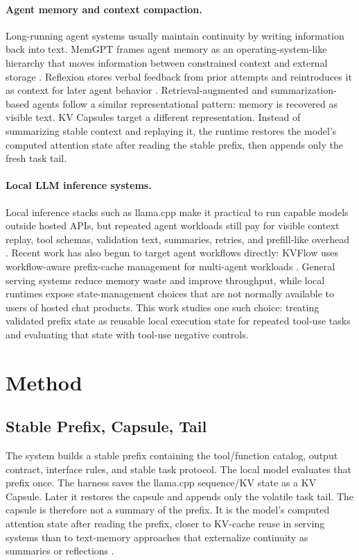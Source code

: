 \documentclass[11pt]{article}
\begin{document}
\paragraph{Agent memory and context compaction.}
Long-running agent systems usually maintain continuity by writing information back into text. MemGPT frames agent memory as an operating-system-like hierarchy that moves information between constrained context and external storage \cite{packer2023memgpt}. Reflexion stores verbal feedback from prior attempts and reintroduces it as context for later agent behavior \cite{shinn2023reflexion}. Retrieval-augmented and summarization-based agents follow a similar representational pattern: memory is recovered as visible text. KV Capsules target a different representation. Instead of summarizing stable context and replaying it, the runtime restores the model's computed attention state after reading the stable prefix, then appends only the fresh task tail.

\paragraph{Local LLM inference systems.}
Local inference stacks such as llama.cpp make it practical to run capable models outside hosted APIs, but repeated agent workloads still pay for visible context replay, tool schemas, validation text, summaries, retries, and prefill-like overhead \cite{llamacpp}. Recent work has also begun to target agent workflows directly: KVFlow uses workflow-aware prefix-cache management for multi-agent workloads \cite{pan2025kvflow}. General serving systems reduce memory waste and improve throughput, while local runtimes expose state-management choices that are not normally available to users of hosted chat products. This work studies one such choice: treating validated prefix state as reusable local execution state for repeated tool-use tasks and evaluating that state with tool-use negative controls.

\section{Method}

\subsection{Stable Prefix, Capsule, Tail}

The system builds a stable prefix containing the tool/function catalog, output contract, interface rules, and stable task protocol. The local model evaluates that prefix once. The harness saves the llama.cpp sequence/KV state as a KV Capsule. Later it restores the capsule and appends only the volatile task tail. The capsule is therefore not a summary of the prefix. It is the model's computed attention state after reading the prefix, closer to KV-cache reuse in serving systems \cite{kwon2023pagedattention,zheng2023sglang} than to text-memory approaches that externalize continuity as summaries or reflections \cite{packer2023memgpt,shinn2023reflexion}.
\end{document}

